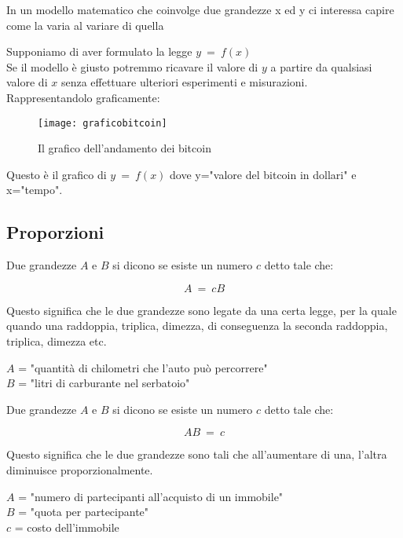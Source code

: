 \documentclass[../appunti.tex]{subfiles}
\begin{document}
In un modello matematico che coinvolge due grandezze x ed y ci interessa capire come la  varia al variare di quella \\

\begin{esem}
Supponiamo di aver formulato la legge $ y\ =\ f(x)\ $\\
Se il modello è giusto potremmo ricavare il valore di $y$ a partire da qualsiasi valore di $x$ senza effettuare ulteriori esperimenti e misurazioni.\\
Rappresentandolo graficamente:

\begin{figure}[ht]
  \center
  \texttt{[image: graficobitcoin]}
  \caption{Il grafico dell'andamento dei bitcoin}
  \label{fig:btc_chart}
\end{figure}
Questo è il grafico di $y\ =\ f(x)$ dove y="valore del bitcoin in dollari" e x="tempo".
\end{esem}

\subsection{Proporzioni}
\begin{defn}
  Due grandezze $A$ e $B$ si dicono  se esiste un numero $c$ detto  tale che:

\begin{equation}
  A\ =\ cB
\end{equation}
\end{defn}

Questo significa che le due grandezze sono legate da una certa legge, per la quale quando una raddoppia, triplica, dimezza, di conseguenza la seconda raddoppia, triplica, dimezza etc.

\begin{esem}
  $A$ = "quantità di chilometri che l'auto può percorrere"\\
  $B$ = "litri di carburante nel serbatoio"
\end{esem}

\begin{defn}
  Due grandezze $A$ e $B$ si dicono  se esiste un numero $c$ detto  tale che:

\begin{equation}
  AB\ =\ c
\end{equation}
\end{defn}
Questo significa che le due grandezze sono tali che all'aumentare di una, l'altra diminuisce proporzionalmente.

\begin{esem}
  $A$ = "numero di partecipanti all'acquisto di un immobile"\\
  $B$ = "quota per partecipante"\\
  $c$ = costo dell'immobile
\end{esem}
\end{document}
